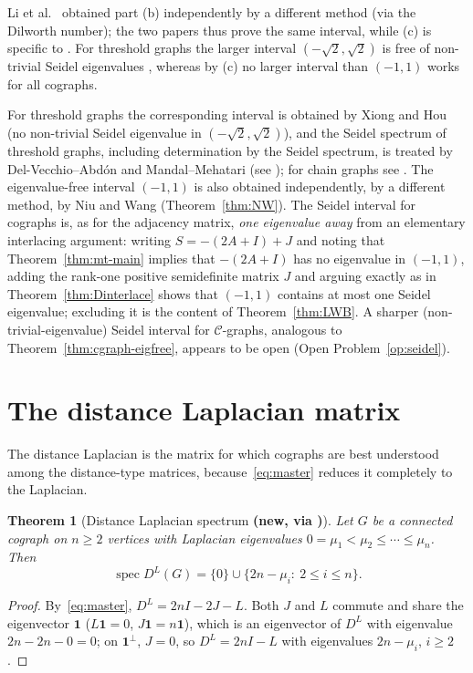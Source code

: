 \documentclass[11pt]{article}
\theoremstyle{plain}
\newtheorem{theorem}{Theorem}[section]
\theoremstyle{definition}
\theoremstyle{remark}
\DeclareMathOperator{\spec}{spec}
\begin{document}
	Li et al.\ \cite{LiWangBrunetti2024} obtained part (b) independently by a different method (via the Dilworth number); the two papers thus prove the same interval, while (c) is specific to \cite{NiuWang2024}. For threshold graphs the larger interval $(-\sqrt2,\sqrt2)$ is free of non-trivial Seidel eigenvalues \cite{XiongHou2022}, whereas by (c) no larger interval than $(-1,1)$ works for all cographs. 
	
	For threshold graphs the corresponding interval is obtained by Xiong and Hou \cite{XiongHou2022} (no non-trivial Seidel eigenvalue in $(-\sqrt2,\sqrt2)$), and the Seidel spectrum of threshold graphs, including determination by the Seidel spectrum, is treated by Del-Vecchio--Abd\'on and Mandal--Mehatari (see \cite{MannaMandal2026}); for chain graphs see \cite{XiongHou2024chain,MandalMehataraDas2022}. The eigenvalue-free interval $(-1,1)$ is also obtained independently, by a different method, by Niu and Wang \cite{NiuWang2024} (Theorem~\ref{thm:NW}). The Seidel interval for cographs is, as for the adjacency matrix, \emph{one eigenvalue away} from an elementary interlacing argument: writing $S=-(2A+I)+J$ and noting that Theorem~\ref{thm:mt-main} implies that $-(2A+I)$ has no eigenvalue in $(-1,1)$, adding the rank-one positive semidefinite matrix $J$ and arguing exactly as in Theorem~\ref{thm:Dinterlace} shows that $(-1,1)$ contains at most one Seidel eigenvalue; excluding it is the content of Theorem~\ref{thm:LWB}. A sharper (non-trivial-eigenvalue) Seidel interval for $\mathcal{C}$-graphs, analogous to Theorem~\ref{thm:cgraph-eigfree}, appears to be open (Open Problem~\ref{op:seidel}).
	
	\section{The distance Laplacian matrix}
	\label{sec:dl}
	
	The distance Laplacian is the matrix for which cographs are best understood among the distance-type matrices, because~\eqref{eq:master} reduces it completely to the Laplacian.
	
	\begin{theorem}[Distance Laplacian spectrum \textbf{(new, via \cite{AouchicheHansen2013})}]
		\label{thm:DLspectrum}
		Let $G$ be a connected cograph on $n\ge2$ vertices with Laplacian eigenvalues $0=\mu_1<\mu_2\le\cdots\le\mu_n$. Then
		\[
		\spec D^L(G)=\{0\}\cup\{2n-\mu_i:\ 2\le i\le n\}.
		\]
	\end{theorem}
	\begin{proof}
		By~\eqref{eq:master}, $D^L=2nI-2J-L$. Both $J$ and $L$ commute and share the eigenvector $\mathbf1$ ($L\mathbf1=0$, $J\mathbf1=n\mathbf1$), which is an eigenvector of $D^L$ with eigenvalue $2n-2n-0=0$; on $\mathbf1^\perp$, $J=0$, so $D^L=2nI-L$ with eigenvalues $2n-\mu_i$, $i\ge2$. \qedhere
	\end{proof}
	
\end{document}
